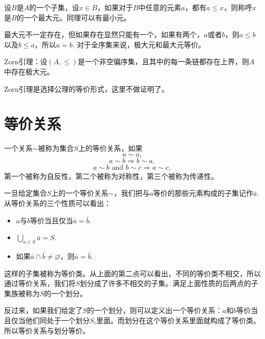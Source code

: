 \para 设$B$是$A$的一个子集，设$x\in B$，如果对于$B$中任意的元素$a$，都有$a\leq x$，则称呼$x$是$B$的一个最大元。同理可以有最小元。

最大元不一定存在，但如果存在显然只能有一个，如果有两个，$a$或者$b$，则$a\leq b$以及$b\leq a$，所以$a=b$. 对于全序集来说，极大元和最大元等价。

\theo Zorn引理：设$(A,\leq)$是一个非空偏序集，且其中的每一条链都存在上界，则$A$中存在极大元。

Zorn引理是选择公理的等价形式，这里不做证明了。

\section{等价关系}
\para 一个关系$\sim$被称为集合$S$上的等价关系，如果
\[
	a\sim a,
\]
\[
	a\sim b \Rightarrow b \sim a,
\]
\[
	a\sim b\text{ and } b\sim c \Rightarrow a \sim c,
\]
第一个被称为自反性，第二个被称为对称性，第三个被称为传递性。

\para 一旦给定集合$S$上的一个等价关系$\sim$，我们把与$a$等价的那些元素构成的子集记作$\bar{a}$. 从等价关系的三个性质可以看出：
\begin{itemize}
\item $a$与$b$等价当且仅当$\bar{a}=\bar{b}$. 
\item $\bigcup_{a\in S}\bar{a}=S$.
\item 如果$\bar{a}\cap \bar{b}\neq \varnothing$，则$\bar{a}=\bar{b}$.
\end{itemize}
这样的子集被称为等价类。从上面的第二点可以看出，不同的等价类不相交，所以通过等价关系，我们将$S$划分成了许多不相交的子集。满足上面性质的后两点的子集族被称为$S$的一个划分。

\para 反过来，如果我们给定了$S$的一个划分，则可以定义出一个等价关系：$a$和$b$等价当且仅当他们同处于一个划分$S_i$里面。而划分在这个等价关系里面就构成了等价类。所以等价关系与划分等价。
